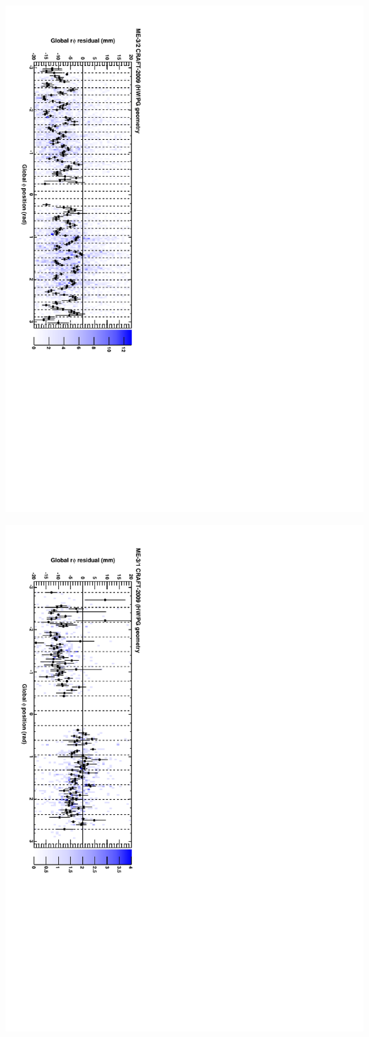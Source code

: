 \documentclass[compress]{beamer}
\begin{document}
\begin{frame}
\vspace{1 cm}
\includegraphics[height=\linewidth, angle=90]{series01.pdf}

\includegraphics[height=\linewidth, angle=90]{series02.pdf}
\end{frame}
\end{document}
